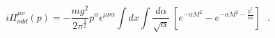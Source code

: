 \begin{equation}
i\Pi^{\mu \nu}_{odd}(p) = -\frac {mg^2}{2 \pi^{ \frac{3}{2} } } p^{\alpha}
\epsilon^{\mu \nu \alpha}\int dx \int \frac { d\alpha}{\sqrt {\alpha}} 
~[ e^{-\alpha M^2} - e^{ -\alpha M^2 - \frac {\tilde p^2}{4\alpha
}}] ~~~.
\end{equation}

